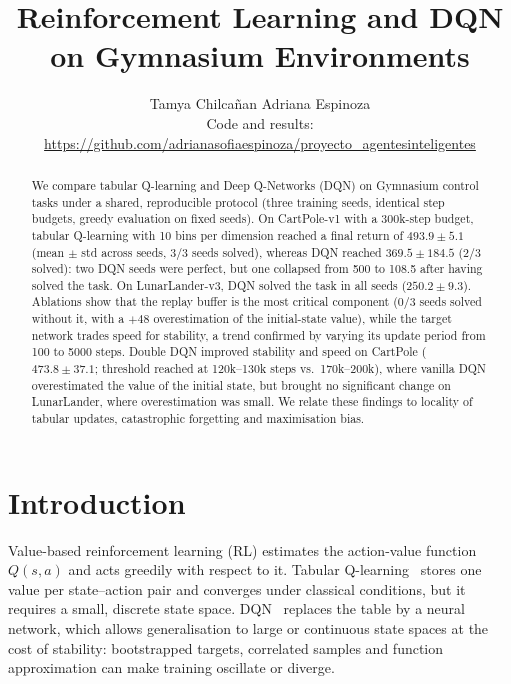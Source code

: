 \documentclass[10pt,twocolumn,letterpaper]{article}
\title{\vspace{-1.2em}\textbf{Reinforcement Learning and DQN on Gymnasium Environments}}
\author{Tamya Chilca\~{n}an \qquad Adriana Espinoza\\[2pt]
\small Code and results: \url{https://github.com/adrianasofiaespinoza/proyecto_agentesinteligentes}}
\date{}
\begin{document}
\maketitle

\begin{abstract}
We compare tabular Q-learning and Deep Q-Networks (DQN) on Gymnasium control tasks under a shared, reproducible protocol (three training seeds, identical step budgets, greedy evaluation on fixed seeds). On CartPole-v1 with a 300k-step budget, tabular Q-learning with 10 bins per dimension reached a final return of $493.9\pm5.1$ (mean $\pm$ std across seeds, 3/3 seeds solved), whereas DQN reached $369.5\pm184.5$ (2/3 solved): two DQN seeds were perfect, but one collapsed from 500 to 108.5 after having solved the task. On LunarLander-v3, DQN solved the task in all seeds ($250.2\pm9.3$). Ablations show that the replay buffer is the most critical component (0/3 seeds solved without it, with a $+48$ overestimation of the initial-state value), while the target network trades speed for stability, a trend confirmed by varying its update period from 100 to 5000 steps. Double DQN improved stability and speed on CartPole ($473.8\pm37.1$; threshold reached at 120k--130k steps vs.\ 170k--200k), where vanilla DQN overestimated the value of the initial state, but brought no significant change on LunarLander, where overestimation was small. We relate these findings to locality of tabular updates, catastrophic forgetting and maximisation bias.
\end{abstract}

\section{Introduction}

Value-based reinforcement learning (RL) estimates the action-value function $Q(s,a)$ and acts greedily with respect to it. Tabular Q-learning~\cite{watkins1992,sutton2018} stores one value per state--action pair and converges under classical conditions, but it requires a small, discrete state space. DQN~\cite{mnih2015} replaces the table by a neural network, which allows generalisation to large or continuous state spaces at the cost of stability: bootstrapped targets, correlated samples and function approximation can make training oscillate or diverge.
\end{document}
